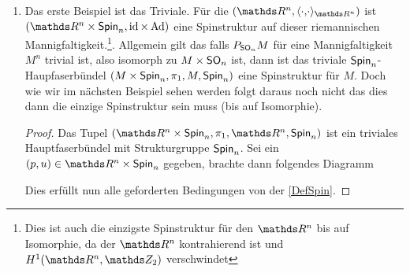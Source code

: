 \begin{Bsp}
  \begin{enumerate}[(1)]
  \item Das erste Beispiel ist das Triviale. Für die \RMF
    $(\R^n, \scdots_{\R^n})$ ist
    $(\R^n \times \spin_n,\id \times \Ad)$ eine Spinstruktur auf
    dieser riemannischen Mannigfaltigkeit.\footnote{Dies ist auch die
      einzigste Spinstruktur für den $ \R^n $ bis auf
      Isomorphie, da der $ \R^n $ kontrahierend ist und $ H^1(\R^n,\Z_2) $ verschwindet}. Allgemein gilt das falls $ P_{\operatorname{\mathsf{SO}}_n}M $ für eine Mannigfaltigkeit
    $ M^n $ trivial ist, also isomorph zu $ M\times \operatorname{\mathsf{SO}}_n $ ist,
    dann ist das triviale $ \operatorname{\mathsf{Spin}}_n $-Haupfaserbündel
    $ (M\times \operatorname{\mathsf{Spin}}_n,\pi_1,M,\operatorname{\mathsf{Spin}}_n) $ eine Spinstruktur für $ M $.
    Doch wie wir im nächsten Beispiel sehen werden folgt daraus noch
    nicht das dies dann die einzige Spinstruktur sein muss (bis auf
    Isomorphie).
    \begin{proof}
      Das Tupel $ (\R^n\times \spin_n,\pi_1,\R^n,\spin_n) $ ist ein
      triviales Hauptfaserbündel mit Strukturgruppe $ \operatorname{\mathsf{Spin}}_n $.  Sei
      ein $ (p,u)\in \R^n\times \spin_n $ gegeben, brachte dann
      folgendes Diagramm
			
      \begin{center}
					
      \end{center}
      Dies erfüllt nun alle geforderten Bedingungen von der \cref{DefSpin}.

    \end{proof}
		

\end{enumerate}
\end{Bsp}
